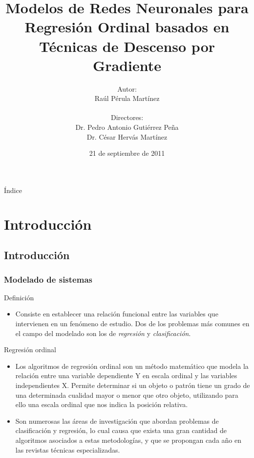 \documentclass[compress,allowframebreaks]{beamer}
\institute{\textsc{Universidad de Córdoba}\\\textsc{Escuela Politécnica Superior}}
\title[Ingeniería Informática]{Modelos de Redes Neuronales para Regresión Ordinal basados en Técnicas de Descenso por Gradiente}
\author{Autor:\\Raúl Pérula Martínez\\ \ \\Directores:\\Dr. Pedro Antonio Gutiérrez Peña\\Dr. César Hervás Martínez}
\date{21 de septiembre de 2011}
\begin{document}
	\begin{frame}[plain]
		\titlepage
	\end{frame}

	\begin{frame}[plain]{\normalsize Índice}
		\setcounter{tocdepth}{1}
		\tableofcontents
	\end{frame}

	\section{Introducción}

		\subsection{Introducción}

			\begin{frame}
				\frametitle{\normalsize Modelado de sistemas}

				\begin{block}{Definición}
					\begin{itemize}\justifying
			      	  \item \small Consiste en establecer una relación funcional entre las variables que intervienen en un fenómeno de estudio. Dos de los problemas más comunes en el campo del modelado son los de \emph{regresión} y \emph{clasificación}.
					\end{itemize}
				\end{block}

				\begin{block}{Regresión ordinal}
					\begin{itemize}\justifying
						\item \small Los algoritmos de regresión ordinal son un método matemático que modela la relación entre una variable dependiente Y en escala ordinal y las variables independientes X. Permite determinar si un objeto o patrón tiene un grado de una determinada cualidad mayor o menor que otro objeto, utilizando para ello una escala ordinal que nos indica la posición relativa.
					\end{itemize}
				\end{block}

				\begin{itemize}\justifying
			        \item \small Son numerosas las áreas de investigación que abordan problemas de clasificación y regresión, lo cual causa que exista una gran cantidad de algoritmos asociados a estas metodologías, y que se propongan cada año en las revistas técnicas especializadas.
				\end{itemize}
			\end{frame}
\end{document}
